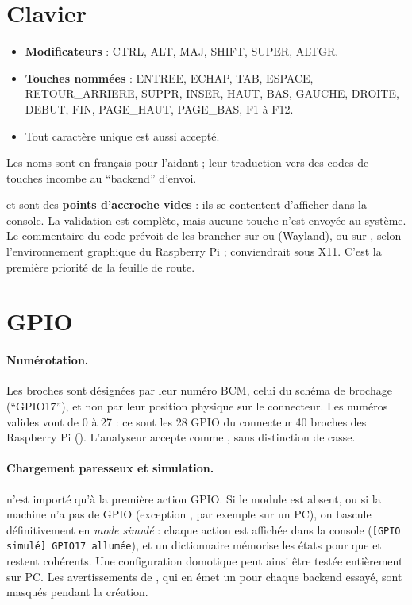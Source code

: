 \section{Clavier}
\label{sec:clavier}

\begin{itemize}
  \item \textbf{Modificateurs} : CTRL, ALT, MAJ, SHIFT, SUPER, ALTGR.
  \item \textbf{Touches nommées} : ENTREE, ECHAP, TAB, ESPACE, RETOUR\_ARRIERE, SUPPR, INSER, HAUT, BAS, GAUCHE, DROITE, DEBUT, FIN, PAGE\_HAUT, PAGE\_BAS, F1 à F12.
  \item Tout caractère unique est aussi accepté.
\end{itemize}
Les noms sont en français pour l'aidant ; leur traduction vers des codes de touches incombe au \enquote{backend} d'envoi.

\begin{attention}
 et  sont des \textbf{points d'accroche vides} : ils se contentent d'afficher  dans la console. La validation est complète, mais aucune touche n'est envoyée au système. Le commentaire du code prévoit de les brancher sur  ou  (Wayland), ou sur , selon l'environnement graphique du Raspberry Pi ;  conviendrait sous X11. C'est la première priorité de la feuille de route.
\end{attention}

\section{GPIO}

\paragraph{Numérotation.} Les broches sont désignées par leur numéro BCM, celui du schéma de brochage (\enquote{GPIO17}), et non par leur position physique sur le connecteur. Les numéros valides vont de 0 à 27 : ce sont les 28 GPIO du connecteur 40 broches des Raspberry Pi (\conv). L'analyseur accepte  comme , sans distinction de casse.

\paragraph{Chargement paresseux et simulation.}  n'est importé qu'à la première action GPIO. Si le module est absent, ou si la machine n'a pas de GPIO (exception , par exemple sur un PC), on bascule définitivement en \emph{mode simulé} : chaque action est affichée dans la console (\texttt{[GPIO simulé] GPIO17 allumée}), et un dictionnaire mémorise les états pour que  et  restent cohérents. Une configuration domotique peut ainsi être testée entièrement sur PC. Les avertissements de , qui en émet un pour chaque backend essayé, sont masqués pendant la création.

